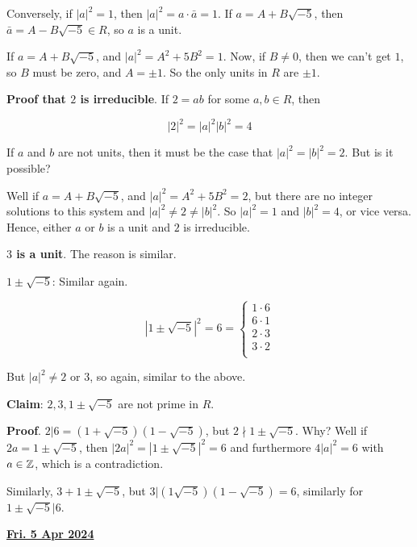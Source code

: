 \documentclass[12pt]{article}
\renewcommand{\date}[1]{\underline{\bf #1}}
\begin{document}
Conversely, if $|a|^2 = 1$, then $|a|^2 = a \cdot \bar a = 1$. If $a = A +
B\sqrt{-5}$, then $\bar a = A - B\sqrt{-5} \in R$, so $a$ is a unit.


If $a = A + B \sqrt{-5}$, and $|a|^2 = A^2 + 5B^2 = 1$. Now, if $B \ne 0$, then
we can't get $1$, so $B$ must be zero, and $A = \pm 1$. So the only units in $R$
are $\pm 1$.

{\bf Proof that $2$ is irreducible}. If $2 = ab$ for some $a, b \in R$, then

\[
  |2|^2 = |a|^2 |b|^2 = 4
\]

If $a$ and $b$ are not units, then it must be the case that $|a|^2 = |b|^2 =
2$. But is it possible?

Well if $a = A + B \sqrt{-5}$, and $|a|^2 = A^2 + 5B^2 = 2$, but there are no
integer solutions to this system and $|a|^2 \ne 2 \ne |b|^2$. So $|a|^2 = 1$ and
$|b|^2 = 4$, or vice versa. Hence, either $a$ or $b$ is a unit and $2$ is
irreducible.

{\bf $3$ is a unit}. The reason is similar.

{\bf $1 \pm \sqrt{-5}$}: Similar again.

\[
  |1 \pm \sqrt{-5}|^2 = 6 = \begin{cases}
    1 \cdot 6 \\
    6 \cdot 1 \\
    2 \cdot 3 \\
    3 \cdot 2 \\
  \end{cases}
\]

But $|a|^2 \ne 2$ or $3$, so again, similar to the above.

{\bf Claim}: $2, 3, 1 \pm \sqrt{-5}$ are not prime in $R$.

{\bf Proof}. $2 | 6 = (1 + \sqrt{-5})(1 - \sqrt{-5})$, but $2 \nmid 1 \pm
\sqrt{-5}$. Why? Well if $2a = 1 \pm \sqrt{-5}$, then $|2a|^2 = |1 \pm
\sqrt{-5}|^2 = 6$ and furthermore $4|a|^2 = 6$ with $a \in {\mathbb Z}$, which is a
contradiction.

Similarly, $3 + 1 \pm \sqrt{-5}$, but $3 | (1 \sqrt{-5})(1 - \sqrt{-5}) = 6$,
similarly for $1 \pm \sqrt{-5} | 6$.

\date{Fri. 5 Apr 2024}
\end{document}
